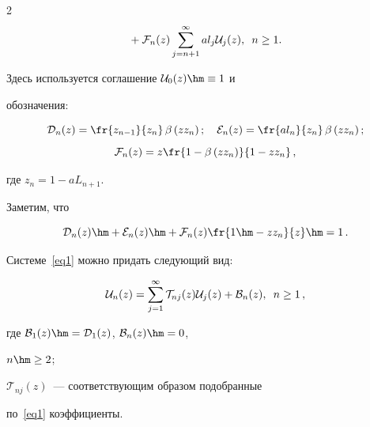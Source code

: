 \begin{multicols}{2}
\begin{multline}
{}+ \mathcal{F}_{n}(z)


\sum\limits_{j=n+1}^\infty


al_j \mathcal{U}_{j}(z),


\enskip n \ge 1.


\end{multline}


Здесь используется соглашение $\mathcal{U}_{0}(z) \hm\equiv 1$ и


обозначения:


$$


\mathcal{D}_{n}(z)


=


\fr{z_{n-1}}{z_{n}}\,


\beta\left( z z_n \right);


\quad


\mathcal{E}_{n}(z)


=


\fr{al_{n}}{z_{n}}\,


\beta\left( z z_n \right);


$$$$


\mathcal{F}_{n}(z)


=


z\fr{ 1- \beta\left( z z_n \right)}{1-z z_n}\,,


$$


где $z_n=1-aL_{n+1}$.





Заметим, что 


$$\mathcal{D}_{n}(z) \hm+ \mathcal{E}_{n}(z)\hm + 


\mathcal{F}_{n}(z) \fr{1\hm-z z_n}{z}\hm=1\,.$$


Системе~\eqref{eq1} можно придать следующий вид:


$$


\mathcal{U}_{n}(z)=


\sum\limits_{j=1}^\infty \mathcal{T}_{nj}(z) \mathcal{U}_{j}(z)


+\mathcal{B}_n(z), \enskip n \ge 1\,,


$$





\noindent 


где $\mathcal{B}_1(z)\hm=\mathcal{D}_{1}(z)$, $\mathcal{B}_n(z)\hm=0$, 


$n\hm\ge 2$;


$\mathcal{T}_{nj}(z)$~--- соответствующим образом подобранные 


по~\eqref{eq1} коэффициенты.



\end{multicols}
